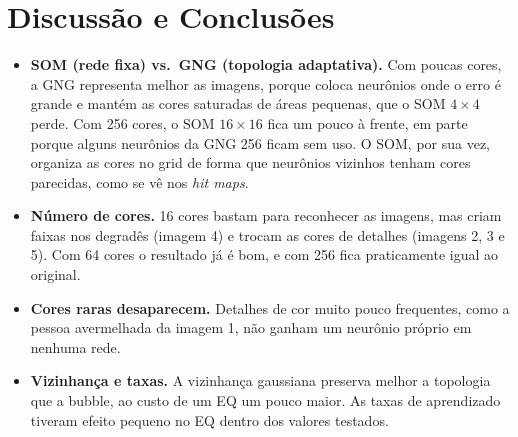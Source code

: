 \documentclass[11pt,a4paper]{article}
\begin{document}
\section{Discussão e Conclusões}

\begin{itemize}
    \item \textbf{SOM (rede fixa) vs.\ GNG (topologia adaptativa).} Com poucas cores, a GNG representa melhor as imagens, porque coloca neurônios onde o erro é grande e mantém as cores saturadas de áreas pequenas, que o SOM $4\times4$ perde. Com 256 cores, o SOM $16\times16$ fica um pouco à frente, em parte porque alguns neurônios da GNG 256 ficam sem uso. O SOM, por sua vez, organiza as cores no grid de forma que neurônios vizinhos tenham cores parecidas, como se vê nos \textit{hit maps}.
    \item \textbf{Número de cores.} 16 cores bastam para reconhecer as imagens, mas criam faixas nos degradês (imagem 4) e trocam as cores de detalhes (imagens 2, 3 e 5). Com 64 cores o resultado já é bom, e com 256 fica praticamente igual ao original.
    \item \textbf{Cores raras desaparecem.} Detalhes de cor muito pouco frequentes, como a pessoa avermelhada da imagem 1, não ganham um neurônio próprio em nenhuma rede.
    \item \textbf{Vizinhança e taxas.} A vizinhança gaussiana preserva melhor a topologia que a bubble, ao custo de um EQ um pouco maior. As taxas de aprendizado tiveram efeito pequeno no EQ dentro dos valores testados.
\end{itemize}
\end{document}
